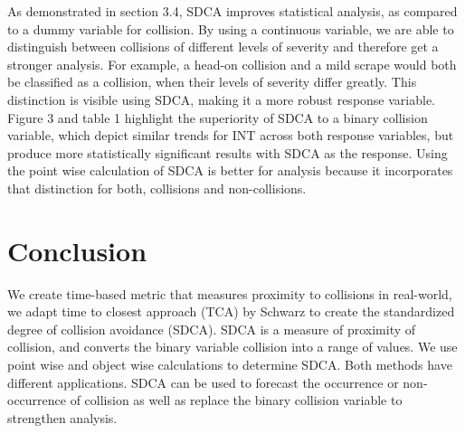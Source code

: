 \documentclass{article}
\begin{document}
As demonstrated in section 3.4, SDCA improves statistical analysis, as compared to a dummy variable for collision. By using a continuous variable, we are able to distinguish between collisions of different levels of severity and therefore get a stronger analysis. For example, a head-on collision and a mild scrape would both be classified as a collision, when their levels of severity differ greatly. This distinction is visible using SDCA, making it a more robust response variable. Figure 3 and table 1 highlight the superiority of SDCA to a binary collision variable, which depict similar trends for INT across both response variables, but produce more statistically significant results with SDCA as the response. Using the point wise calculation of SDCA is better for analysis because it incorporates that distinction for both, collisions and non-collisions.
\section{Conclusion}
We create time-based metric that measures proximity to collisions in real-world, we adapt time to closest approach (TCA) by Schwarz to create the standardized degree of collision avoidance (SDCA). SDCA is a measure of proximity of collision, and converts the binary variable collision into a range of values. We use point wise and object wise calculations to determine SDCA. Both methods have different applications. SDCA can be used to forecast the occurrence or non-occurrence of collision as well as replace the binary collision variable to strengthen analysis.

 
\end{document}
